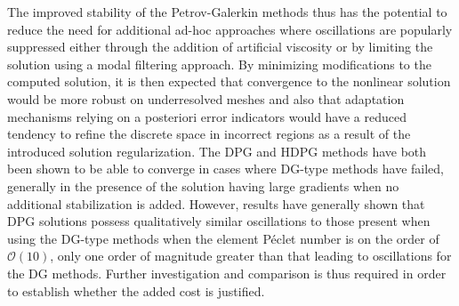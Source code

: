 The improved stability of the Petrov-Galerkin methods thus has the potential to reduce the need
for additional ad-hoc approaches where oscillations are popularly suppressed
either through the addition of artificial viscosity or by limiting the solution
using a modal filtering approach. By minimizing modifications to the computed
solution, it is then expected that convergence to the nonlinear solution would
be more robust on underresolved meshes and also that adaptation mechanisms
relying on a posteriori error indicators would have a reduced tendency to refine
the discrete space in incorrect regions as a result of the introduced solution regularization.
The DPG and HDPG methods have both been shown to be able to converge in cases
where DG-type methods have failed, generally in the presence of the
solution having large gradients when no additional stabilization is added.
However, results have generally shown that DPG solutions possess qualitatively
similar oscillations to those present when using the DG-type methods when the
element P\'eclet number is on the order of $\mathcal{O}(10)$, only one order
of magnitude greater than that leading to oscillations for the DG methods.
Further investigation and comparison is thus required in order to establish whether
the added cost is justified.